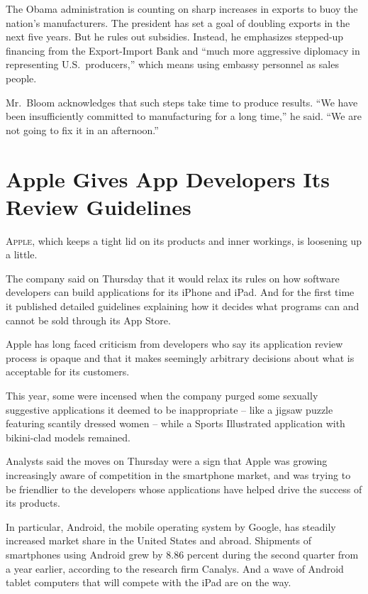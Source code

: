 ﻿\documentclass[12pt]{article}
\begin{document}
The Obama administration is counting on sharp increases in exports to buoy the nation's
manufacturers. The president has set a goal of doubling exports in the next five years. But he rules
out subsidies. Instead, he emphasizes stepped-up financing from the Export-Import Bank and ``much
more aggressive diplomacy in representing U.S.~producers,'' which means using embassy personnel as
sales people.

Mr.~Bloom acknowledges that such steps take time to produce results. ``We have been insufficiently
committed to manufacturing for a long time,'' he said. ``We are not going to fix it in an
afternoon.''

\pagebreak
\section{Apple Gives App Developers Its Review Guidelines}

\lettrine{A}{pple}, which keeps a tight lid on its products and inner
workings, is loosening up a little.

The company said on Thursday that it would relax its rules on how software developers can build
applications for its iPhone and iPad. And for the first time it published detailed guidelines
explaining how it decides what programs can and cannot be sold through its App Store.

Apple has long faced criticism from developers who say its application review process is opaque and
that it makes seemingly arbitrary decisions about what is acceptable for its customers.

This year, some were incensed when the company purged some sexually suggestive applications it
deemed to be inappropriate -- like a jigsaw puzzle featuring scantily dressed women -- while a
Sports Illustrated application with bikini-clad models remained.

Analysts said the moves on Thursday were a sign that Apple was growing increasingly aware of
competition in the smartphone market, and was trying to be friendlier to the developers whose
applications have helped drive the success of its products.

In particular, Android, the mobile operating system by Google, has steadily increased market share
in the United States and abroad. Shipments of smartphones using Android grew by 8.86 percent during
the second quarter from a year earlier, according to the research firm Canalys. And a wave of
Android tablet computers that will compete with the iPad are on the way.
\end{document}
